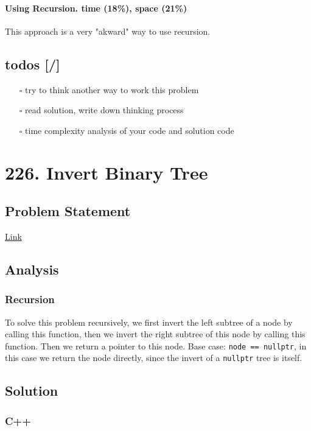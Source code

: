 \documentclass[12pt]{article}
\begin{document}
\paragraph{Using Recursion. time (18\%), space (21\%)}
\label{sec:orgf1b0001}
This approach is a very "akward" way to use recursion.
\subsection{todos [/]}
\label{sec:orgc2bb140}
\begin{itemize}
\item[{$\square$}] try to think another way to work this problem
\item[{$\square$}] read solution, write down thinking process
\item[{$\square$}] time complexity analysis of your code and solution code
\end{itemize}
\section{226. Invert Binary Tree}
\label{sec:org7fe2fec}
\subsection{Problem Statement}
\label{sec:org4b99182}
\href{https://leetcode.com/problems/invert-binary-tree/}{Link}
\subsection{Analysis}
\label{sec:orge9639f0}
\subsubsection{Recursion}
\label{sec:org7fe897e}
To solve this problem recursively, we first invert the left subtree of a node by calling this function, then we invert the right subtree of this node by calling this function. Then we return a pointer to this node. Base case: \texttt{node == nullptr}, in this case we return the node directly, since the invert of a \texttt{nullptr} tree is itself.
\subsection{Solution}
\label{sec:orge580826}
\subsubsection{C++}
\label{sec:org79b60a4}
\end{document}
